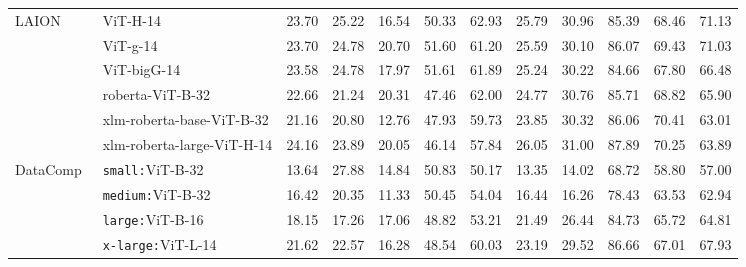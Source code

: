 \begin{table}[h]
{\begin{tabular}{ll cccccccccc}
\multirow{6}{*}{LAION~\cite{laion5b}}  & ViT-H-14 & 23.70 & 25.22 & 16.54 & 50.33 & 62.93 & 25.79 & 30.96 & 85.39 & 68.46 & 71.13\\
& ViT-g-14 & 23.70 & 24.78 & 20.70 & 51.60 & 61.20 & 25.59 & 30.10 & 86.07 & 69.43 & 71.03\\
& ViT-bigG-14 & 23.58 & 24.78 & 17.97 & 51.61 & 61.89 & 25.24 & 30.22 & 84.66 & 67.80 & 66.48\\
& roberta-ViT-B-32 & 22.66 & 21.24 & 20.31 & 47.46 & 62.00 & 24.77 & 30.76 & 85.71 & 68.82 & 65.90\\
& xlm-roberta-base-ViT-B-32 & 21.16 & 20.80 & 12.76 & 47.93 & 59.73 & 23.85 & 30.32 & 86.06 & 70.41 & 63.01\\
& xlm-roberta-large-ViT-H-14 & 24.16 & 23.89 & 20.05 & 46.14 & 57.84 & 26.05 & 31.00 & 87.89 & 70.25 & 63.89\\

\midrule

\multirow{4}{*}{DataComp~\cite{gadre2023datacomp}}  
& \texttt{small:}ViT-B-32 & 13.64 & 27.88 & 14.84 & 50.83 & 50.17 & 13.35 & 14.02 & 68.72 & 58.80 & 57.00\\
& \texttt{medium:}ViT-B-32 & 16.42 & 20.35 & 11.33 & 50.45 & 54.04 & 16.44 & 16.26 & 78.43 & 63.53 & 62.94\\
& \texttt{large:}ViT-B-16 & 18.15 & 17.26 & 17.06 & 48.82 & 53.21 & 21.49 & 26.44 & 84.73 & 65.72 & 64.81\\
& \texttt{x-large:}ViT-L-14 & 21.62 & 22.57 & 16.28 & 48.54 & 60.03 & 23.19 & 29.52 & 86.66 & 67.01 & 67.93\\

\bottomrule 
\end{tabular}
}
  
  \label{tab:eval_existing}

\end{table}
